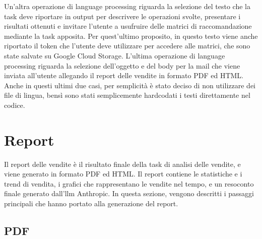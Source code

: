 Un'altra operazione di language processing riguarda la selezione del testo che la task deve riportare in output per descrivere le operazioni svolte, presentare i risultati ottenuti e invitare l'utente a usufruire delle matrici di raccomandazione mediante la task apposita. Per quest'ultimo proposito, in questo testo viene anche riportato il token che l'utente deve utilizzare per accedere alle matrici, che sono state salvate su Google Cloud Storage.
L'ultima operazione di language processing riguarda la selezione dell'oggetto e del body per la mail che viene inviata all'utente allegando il report delle vendite in formato PDF ed HTML.
Anche in questi ultimi due casi, per semplicità è stato deciso di non utilizzare dei file di lingua, bensì sono stati semplicemente hardcodati i testi direttamente nel codice.


\section{Report}

Il report delle vendite è il risultato finale della task di analisi delle vendite, e viene generato in formato PDF ed HTML. Il report contiene le statistiche e i trend di vendita, i grafici che rappresentano le vendite nel tempo, e un resoconto finale generato dall'\gls{llm} Anthropic.
In questa sezione, vengono descritti i passaggi principali che hanno portato alla generazione del report.

\subsection{PDF}

